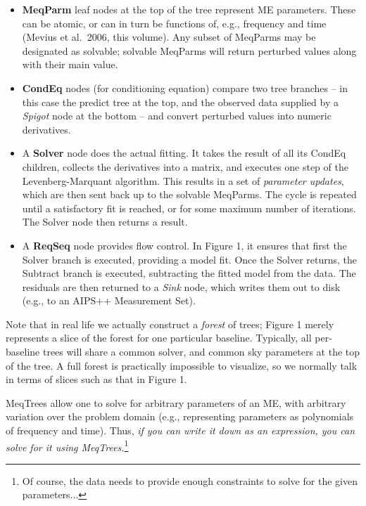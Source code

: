 \documentclass[11pt,twoside]{article}  %
\begin{document}
\begin{itemize}

\item {\bf MeqParm} leaf nodes at the top of the tree represent ME parameters.
These can be atomic, or can in turn be functions of, e.g., frequency and time
(Mevius et al.\  2006, this volume). Any subset of MeqParms may be designated as
solvable; solvable MeqParms will return perturbed values along with their main
value.

\item {\bf CondEq} nodes (for conditioning equation) compare two tree branches
-- in this case the predict tree at the top, and the observed data supplied by a
{\em Spigot} node at the bottom -- and convert perturbed values into numeric
derivatives.

\item A {\bf Solver} node does the actual fitting. It takes the result of all
its CondEq children, collects the derivatives into a matrix, and executes one
step of the Levenberg-Marquant algorithm. This results in a set of {\em
parameter updates}, which are then sent back up to the solvable MeqParms. The
cycle is repeated until a satisfactory fit is reached, or for some maximum
number of iterations. The Solver node then returns a result.

\item A {\bf ReqSeq} node provides flow control. In Figure 1, it ensures that
first the Solver branch is executed, providing a model fit. Once the Solver
returns, the Subtract branch is executed, subtracting the fitted model from the
data. The residuals are then returned to a {\em Sink} node, which writes them
out to disk (e.g., to an AIPS++ Measurement Set).

\end{itemize}

Note that in real life we actually construct a {\em forest} of trees; Figure 1
merely represents a slice of the forest for one particular baseline. Typically,
all per-baseline trees will share a common solver, and common sky parameters at
the top of the tree. A full forest is practically impossible to visualize, so we
normally talk in terms of slices such as that in Figure 1.

MeqTrees allow one to solve for arbitrary parameters of an ME, with arbitrary
variation over the problem domain (e.g., representing parameters as polynomials
of frequency and time). Thus, {\em if you can write it down as an expression,
you can solve for it using MeqTrees.}\footnote{Of course, the data needs to
provide enough constraints to solve for the given parameters...}
\end{document}
